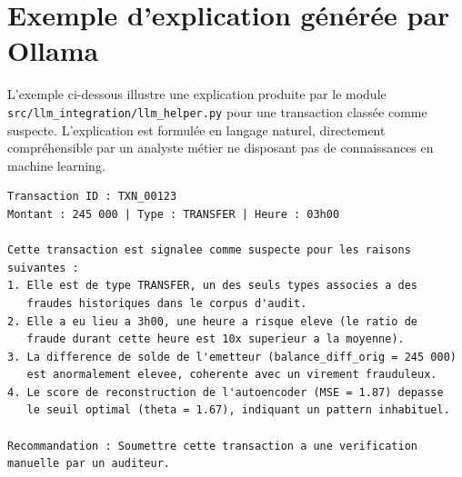 \documentclass[12pt,a4paper,twoside]{report}
\begin{document}
\section{Exemple d'explication générée par Ollama}
\label{sec:ollama_example_app}

L'exemple ci-dessous illustre une explication produite par le module \texttt{src/llm\_integration/llm\_helper.py} pour une transaction classée comme suspecte. L'explication est formulée en langage naturel, directement compréhensible par un analyste métier ne disposant pas de connaissances en machine learning.

\begin{lstlisting}[caption={Exemple d'explication Ollama pour une transaction suspecte},label={lst:ollama_example}]
Transaction ID : TXN_00123
Montant : 245 000 | Type : TRANSFER | Heure : 03h00

Cette transaction est signalee comme suspecte pour les raisons
suivantes :
1. Elle est de type TRANSFER, un des seuls types associes a des
   fraudes historiques dans le corpus d'audit.
2. Elle a eu lieu a 3h00, une heure a risque eleve (le ratio de
   fraude durant cette heure est 10x superieur a la moyenne).
3. La difference de solde de l'emetteur (balance_diff_orig = 245 000)
   est anormalement elevee, coherente avec un virement frauduleux.
4. Le score de reconstruction de l'autoencoder (MSE = 1.87) depasse
   le seuil optimal (theta = 1.67), indiquant un pattern inhabituel.

Recommandation : Soumettre cette transaction a une verification
manuelle par un auditeur.
\end{lstlisting}
\end{document}
